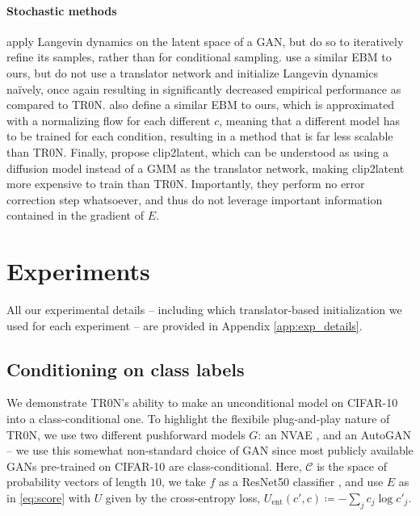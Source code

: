 \documentclass[nohyperref]{article}
\theoremstyle{plain}
\theoremstyle{definition}
\theoremstyle{remark}
\begin{document}
\paragraph{Stochastic methods} \citet{ansari2021refining} apply Langevin dynamics on the latent space of a GAN, but do so to iteratively refine its samples, rather than for conditional sampling. \citet{nguyen2017plug} use a similar EBM to ours, but do not use a translator network and initialize Langevin dynamics na\"{i}vely, once again resulting in significantly decreased empirical performance as compared to TR0N. \citet{promptgen2022} also define a similar EBM to ours, which is approximated with a normalizing flow for each different $c$, meaning that a different model has to be trained for each condition, resulting in a method that is far less scalable than TR0N. Finally, \citet{Pinkney2022clip2latent} propose clip2latent, which can be understood as using a diffusion model instead of a GMM as the translator network, making clip2latent more expensive to train than TR0N. Importantly, they perform no error correction step whatsoever, and thus do not leverage important information contained in the gradient of $E$.
 
\section{Experiments}
All our experimental details -- including which translator-based initialization we used for each experiment -- are provided in Appendix \ref{app:exp_details}.

\subsection{Conditioning on class labels}

We demonstrate TR0N's ability to make an unconditional model on CIFAR-10 \citep{krizhevsky2009learning} into a class-conditional one. To highlight the flexibile plug-and-play nature of TR0N, we use two different pushforward models $G$: an NVAE \citep{Vahdat2020NVAEAD}, and an AutoGAN \citep{Gong2019AutoGANNA} -- we use this somewhat non-standard choice of GAN since most publicly available GANs pre-trained on CIFAR-10 are class-conditional. 
Here, $\mathcal{C}$ is the space of probability vectors of length $10$, we take $f$ as a ResNet50 classifier \cite{He2015DeepRL}, and use $E$ as in \eqref{eq:score} with $U$ given by the cross-entropy loss, $U_{\text{ent}}(c', c) \coloneqq -\sum_j c_j \log c'_j$.
\end{document}
